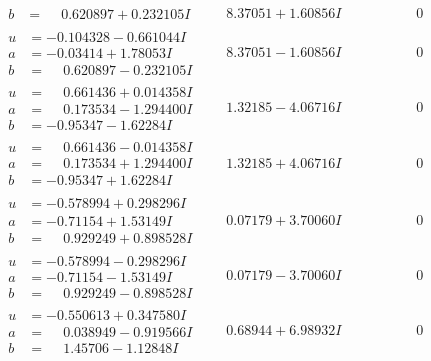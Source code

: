 \documentclass[1p]{elsarticle_modified}
\theoremstyle{definition}
\begin{document}
$$\begin{array}{c|c|c}
\begin{aligned}
b &= \phantom{-}0.620897 + 0.232105 I\end{aligned}
 & \phantom{-}8.37051 + 1.60856 I & \phantom{-0.000000 } 0 \\ \hline\begin{aligned}
u &= -0.104328 - 0.661044 I \\
a &= -0.03414 + 1.78053 I \\
b &= \phantom{-}0.620897 - 0.232105 I\end{aligned}
 & \phantom{-}8.37051 - 1.60856 I & \phantom{-0.000000 } 0 \\ \hline\begin{aligned}
u &= \phantom{-}0.661436 + 0.014358 I \\
a &= \phantom{-}0.173534 - 1.294400 I \\
b &= -0.95347 - 1.62284 I\end{aligned}
 & \phantom{-}1.32185 - 4.06716 I & \phantom{-0.000000 } 0 \\ \hline\begin{aligned}
u &= \phantom{-}0.661436 - 0.014358 I \\
a &= \phantom{-}0.173534 + 1.294400 I \\
b &= -0.95347 + 1.62284 I\end{aligned}
 & \phantom{-}1.32185 + 4.06716 I & \phantom{-0.000000 } 0 \\ \hline\begin{aligned}
u &= -0.578994 + 0.298296 I \\
a &= -0.71154 + 1.53149 I \\
b &= \phantom{-}0.929249 + 0.898528 I\end{aligned}
 & \phantom{-}0.07179 + 3.70060 I & \phantom{-0.000000 } 0 \\ \hline\begin{aligned}
u &= -0.578994 - 0.298296 I \\
a &= -0.71154 - 1.53149 I \\
b &= \phantom{-}0.929249 - 0.898528 I\end{aligned}
 & \phantom{-}0.07179 - 3.70060 I & \phantom{-0.000000 } 0 \\ \hline\begin{aligned}
u &= -0.550613 + 0.347580 I \\
a &= \phantom{-}0.038949 - 0.919566 I \\
b &= \phantom{-}1.45706 - 1.12848 I\end{aligned}
 & \phantom{-}0.68944 + 6.98932 I & \phantom{-0.000000 } 0 \\ \hline\begin{aligned}

\end{aligned}
\end{array}$$
\end{document}
